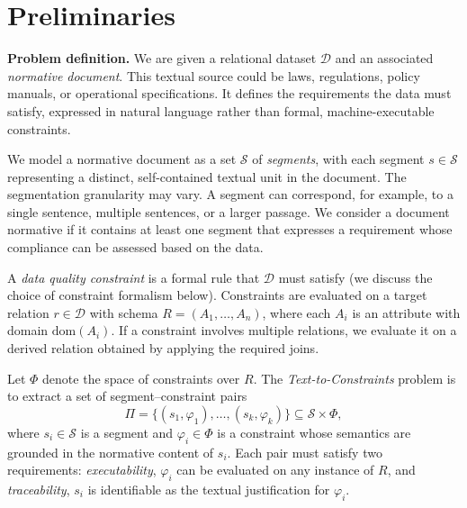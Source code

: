 \section{Preliminaries}
\label{sec:problem}

\smallskip\noindent\textbf{Problem definition.}
We are given a relational dataset $\mathcal{D}$ and an associated \emph{normative document}. This textual source could be laws, regulations, policy manuals, or operational specifications. It defines the requirements the data must satisfy, expressed in natural language rather than formal, machine-executable constraints.

We model a normative document as a set $\mathcal{S}$ of \emph{segments}, with each segment $s \in \mathcal{S}$ representing a distinct, self-contained textual unit in the document. The segmentation granularity may vary. A segment can correspond, for example, to a single sentence, multiple sentences, or a larger passage. We consider a document normative if it contains at least one segment that expresses a requirement whose compliance can be assessed based on the data.








A \emph{data quality constraint} is a formal rule that $\mathcal{D}$ must satisfy (we discuss the choice of constraint formalism below).
Constraints are evaluated on a target relation $r \in \mathcal{D}$ with schema $R = (A_1, \ldots, A_n)$, where each $A_i$ is an attribute with domain
$\mathrm{dom}(A_i)$. If a constraint involves multiple relations, we evaluate it on a derived relation obtained by applying the required joins.


Let $\Phi$ denote the space of constraints over $R$.
The \emph{Text-to-Constraints} problem is to extract a set of segment--constraint pairs
\[
\Pi = \{(s_1, \varphi_1), \ldots, (s_k, \varphi_k)\} \subseteq \mathcal{S} \times \Phi,
\]
where $s_i \in \mathcal{S}$ is a segment and $\varphi_i \in \Phi$ is a constraint whose semantics are grounded in the normative content of $s_i$.
Each pair must satisfy two requirements: \emph{executability}, ${\varphi_i}$ can be evaluated on any instance of $R$, 
and \emph{traceability}, $s_i$ is identifiable as the textual justification for $\varphi_i$.

